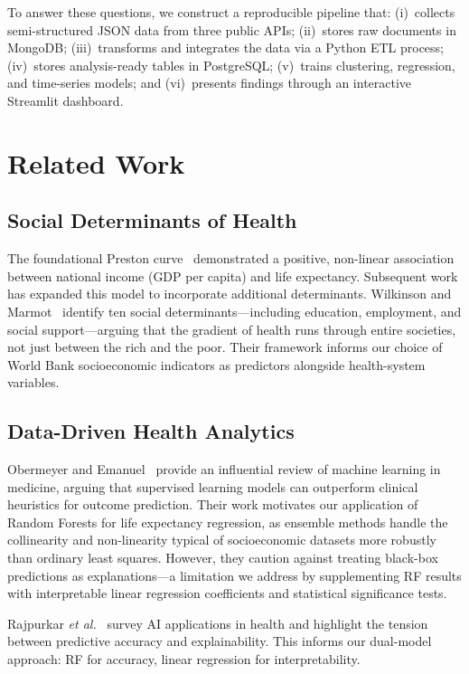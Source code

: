\documentclass[conference]{IEEEtran}
\begin{document}
To answer these questions, we construct a reproducible pipeline that: (i)~collects
semi-structured JSON data from three public APIs; (ii)~stores raw documents in
MongoDB; (iii)~transforms and integrates the data via a Python ETL process;
(iv)~stores analysis-ready tables in PostgreSQL; (v)~trains clustering,
regression, and time-series models; and (vi)~presents findings through an
interactive Streamlit dashboard.

\section{Related Work}

\subsection{Social Determinants of Health}
The foundational Preston curve~\cite{preston1975} demonstrated a positive,
non-linear association between national income (GDP per capita) and life
expectancy. Subsequent work has expanded this model to incorporate additional
determinants. Wilkinson and Marmot~\cite{wilkinson2003} identify ten social
determinants---including education, employment, and social support---arguing
that the gradient of health runs through entire societies, not just between
the rich and the poor. Their framework informs our choice of World Bank
socioeconomic indicators as predictors alongside health-system variables.

\subsection{Data-Driven Health Analytics}
Obermeyer and Emanuel~\cite{obermeyer2016} provide an influential review of
machine learning in medicine, arguing that supervised learning models can
outperform clinical heuristics for outcome prediction. Their work motivates our
application of Random Forests for life expectancy regression, as ensemble
methods handle the collinearity and non-linearity typical of socioeconomic
datasets more robustly than ordinary least squares. However, they caution
against treating black-box predictions as explanations---a limitation we
address by supplementing RF results with interpretable linear regression
coefficients and statistical significance tests.

Rajpurkar \emph{et al.}~\cite{rajpurkar2022} survey AI applications in health
and highlight the tension between predictive accuracy and explainability. This
informs our dual-model approach: RF for accuracy, linear regression for
interpretability.
\end{document}
